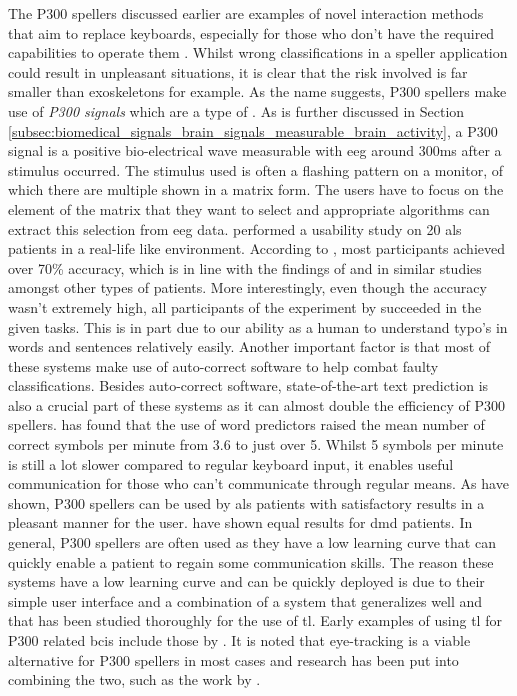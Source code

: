The P300 spellers discussed earlier are examples of novel interaction methods that aim to replace keyboards, especially for those who don't have the required capabilities to operate them \citep{p300_spellers, p300_spellers_review}.
Whilst wrong classifications in a speller application could result in unpleasant situations, it is clear that the risk involved is far smaller than exoskeletons for example.
As the name suggests,  P300 spellers make use of \textit{P300 signals} which are a type of .
As is further discussed in Section \ref{subsec:biomedical_signals_brain_signals_measurable_brain_activity}, a P300 signal is a positive bio-electrical wave measurable with \gls{eeg} around 300ms after a stimulus occurred.
The stimulus used is often a flashing pattern on a monitor, of which there are multiple shown in a matrix form.
The users have to focus on the element of the matrix that they want to select and appropriate algorithms can extract this selection from \gls{eeg} data.
 performed a usability study on 20 \gls{als} patients in a real-life like environment.
According to \citet{p300_speller_real_life}, most participants achieved over 70\% accuracy, which is in line with the findings of \citet{p300_spellers_review} and \citet{p300_speller_real_life2} in similar studies amongst other types of patients.
More interestingly, even though the accuracy wasn't extremely high, all participants of the experiment by \citet{p300_speller_real_life} succeeded in the given tasks.
This is in part due to our ability as a human to understand typo's in words and sentences relatively easily.
Another important factor is that most of these systems make use of auto-correct software to help combat faulty classifications.
Besides auto-correct software, state-of-the-art text prediction is also a crucial part of these systems as it can almost double the efficiency of P300 spellers.
\citet{p300_speller_real_life} has found that the use of word predictors raised the mean number of correct symbols per minute from 3.6 to just over 5.
Whilst 5 symbols per minute is still a lot slower compared to regular keyboard input, it enables useful communication for those who can't communicate through regular means.
As \citet{p300_speller_real_life2} have shown, P300 spellers can be used by \gls{als} patients with satisfactory results in a pleasant manner for the user.
 have shown equal results for \gls{dmd} patients.
In general, P300 spellers are often used as they have a low learning curve that can quickly enable a patient to regain some communication skills.
The reason these systems have a low learning curve and can be quickly deployed is due to their simple user interface and a combination of a system that generalizes well and that has been studied thoroughly for the use of \gls{tl}.
Early examples of using \gls{tl} for P300 related \glspl{bci} include those by \citet{p300_speller_tl}.
It is noted that eye-tracking is a viable alternative for P300 spellers in most cases and research has been put into combining the two, such as the work by \citet{p300_eye_tracking_speller}.

